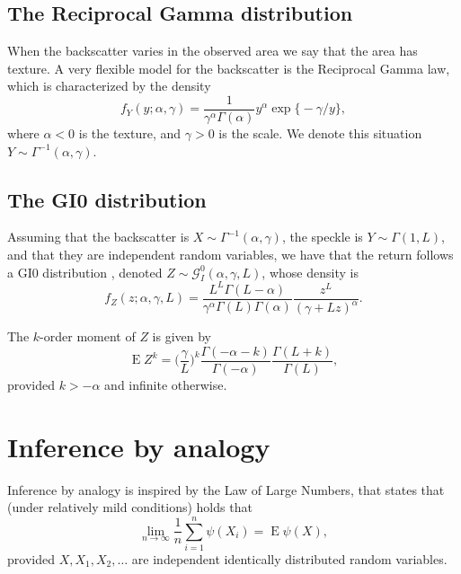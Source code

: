 \subsection{The Reciprocal Gamma distribution}

When the backscatter varies in the observed area we say that the area has texture.
A very flexible model for the backscatter is the Reciprocal Gamma law\cite{frery96}, which is characterized by the density
\begin{equation}
f_Y(y;\alpha,\gamma)= \frac{1}{\gamma^\alpha \Gamma(\alpha)}
y^\alpha \exp\big\{-\gamma/y\big\},
\label{eq:IGDensity}
\end{equation}
where $\alpha<0$ is the texture, and
$\gamma>0$ is the scale.
We denote this situation $Y\sim \Gamma^{-1}(\alpha,\gamma)$.

\subsection{The GI0 distribution}

Assuming that the backscatter is $X\sim\Gamma^{-1}(\alpha,\gamma)$,
the speckle is $Y\sim\Gamma(1,L)$, and that they are independent random variables, we have that the return follows a GI0 distribution\cite{GeodesicDistanceGI0JSTARS}%
\cite{ParameterEstimationSARStochasticDistancesKernels}, denoted $Z\sim\mathcal G_I^0(\alpha,\gamma,L)$, whose density is
\begin{equation}
f_Z(z;\alpha,\gamma,L) = \frac{L^L \Gamma(L-\alpha)}{\gamma^\alpha \Gamma(L) \Gamma(\alpha)}
\frac{z^L}{(\gamma+Lz)^\alpha}.
\end{equation}

The $k$-order moment of $Z$ is given by
\begin{equation}
\operatorname{E}Z^k = \Big(\frac{\gamma}{L}\Big)^k
\frac{\Gamma(-\alpha-k)}{\Gamma(-\alpha)}
\frac{\Gamma(L+k)}{\Gamma(L)},
\label{eq:MomGI0}
\end{equation}
provided $k>-\alpha$ and infinite otherwise.

\section{Inference by analogy}

Inference by analogy\cite{manski_analog} is inspired by the Law of Large Numbers, that states that (under relatively mild conditions) holds that
\begin{equation}
\lim_{n\to\infty}\frac1n\sum_{i=1}^{n} \psi(X_i) = 
\operatorname{E}\psi(X),
\label{eq:LLN}
\end{equation}
provided $X,X_1,X_2,\dots$ are independent identically distributed random variables.


